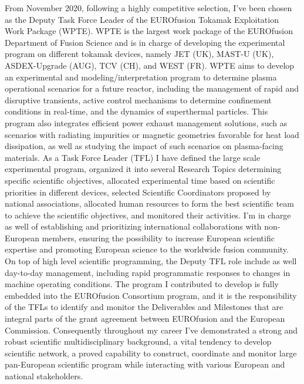 From November 2020,  following a highly competitive 
selection, I've been 
chosen as the Deputy Task Force Leader of the EUROfusion Tokamak
Exploitation Work Package (WPTE). WPTE is the largest work package of
the EUROfusion Department
of Fusion Science and is in charge of developing the experimental
program on different tokamak devices, namely JET (UK), MAST-U (UK),
ASDEX-Upgrade (AUG), TCV (CH), and WEST (FR).
WPTE aims to develop an experimental and modeling/interpretation
program to determine plasma operational scenarios for a future
reactor, including the
management of rapid and disruptive transients, active control
mechanisms to
determine confinement conditions in real-time, and the dynamics of
superthermal particles.
This program also integrates efficient power exhaust management solutions,
such as scenarios with
radiating impurities or magnetic geometries favorable for heat load
dissipation, as well as studying the impact of such scenarios on
plasma-facing materials.
As a Task Force Leader (TFL) I have defined the large scale experimental program,
organized it into several Research Topics
determining specific scientific objectives, allocated
experimental time based on
scientific priorities in different devices, selected Scientific
Coordinators proposed by
national associations, allocated human resources to form the best
scientific team
to achieve the scientific objectives, and monitored their
activities. I'm in charge as well of establishing and prioritizing
international collaborations with non-European members,  ensuring the possibility to increase
European scientific expertise and promoting European science to the
worldwide fusion community. 
On top of high level scientific programming, the Deputy
TFL role include as well day-to-day management, including rapid
programmatic responses to changes in machine operating conditions. 
The program I contributed to develop is fully embedded into the 
EUROfusion Consortium program, and it is the responsibility of the
TFLs to
identify and monitor the Deliverables and Milestones that are integral parts of
the grant agreement between
EUROfusion and the European Commission.
Consequently throughout my career I've demonstrated a strong and
robust scientific multidisciplinary background, a vital tendency to develop scientific 
network, a proved capability to construct, coordinate and monitor
large pan-European scientific program while interacting with various European and national
stakeholders.

